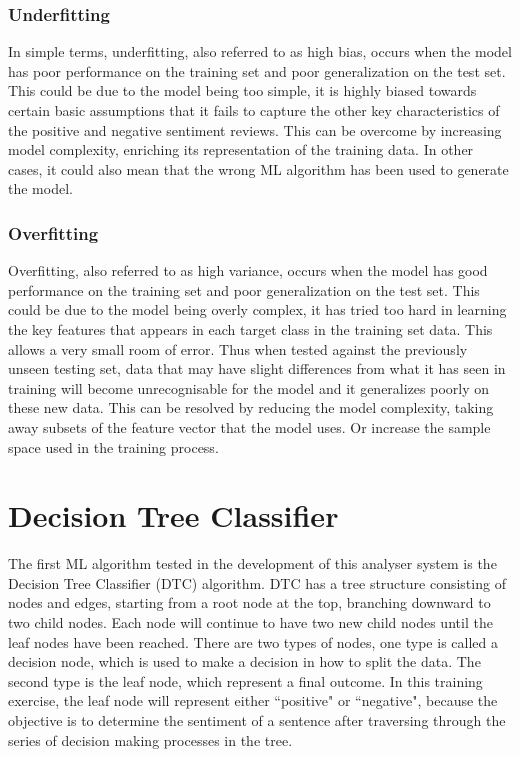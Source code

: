 \documentclass[a4paper]{report}
\begin{document}
{{\subsubsection{Underfitting}
In simple terms, underfitting, also referred to as high bias, occurs when the model has poor performance on the training set and poor generalization on the test set. This could be due to the model being too simple, it is highly biased towards certain basic assumptions that it fails to capture the other key characteristics of the positive and negative sentiment reviews. This can be overcome by increasing model complexity, enriching its representation of the training data. In other cases, it could also mean that the wrong ML algorithm has been used to generate the model.

\subsubsection{Overfitting}
Overfitting, also referred to as high variance, occurs when the model has good performance on the training set and poor generalization on the test set. This could be due to the model being overly complex, it has tried too hard in learning the key features that appears in each target class in the training set data. This allows a very small room of error. Thus when tested against the previously unseen testing set, data that may have slight differences from what it has seen in training will become unrecognisable for the model and it generalizes poorly on these new data. This can be resolved by reducing the model complexity, taking away subsets of the feature vector that the model uses. Or increase the sample space used in the training process.

\section{Decision Tree Classifier}

The first ML algorithm tested in the development of this analyser system is the Decision Tree Classifier (DTC) algorithm. DTC has a tree structure consisting of nodes and edges, starting from a root node at the top, branching downward to two child nodes. Each node will continue to have two new child nodes until the leaf nodes have been reached. There are two types of nodes, one type is called a decision node, which is used to make a decision in how to split the data. The second type is the leaf node, which represent a final outcome. In this training exercise, the leaf node will represent either “positive" or “negative", because the objective is to determine the sentiment of a sentence after traversing through the series of decision making processes in the tree.

}}
\end{document}
